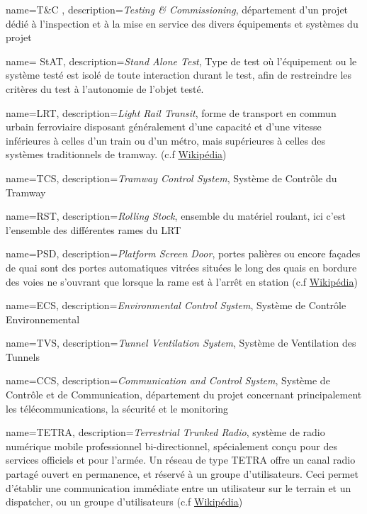 \usepackage[toc,section=chapter]{glossaries}    %
\makeglossaries

{
	name=T\&C ,
	description={\textit{Testing \& Commissioning}, département d'un projet dédié à l'inspection et à la mise en service des divers équipements et systèmes du projet}
}

{
	name= StAT,
	description={\textit{Stand Alone Test}, Type de test où l'équipement ou le système testé est isolé de toute interaction durant le test, afin de restreindre les critères du test à l'autonomie de l'objet testé. }
}

{
	name=LRT,
	description={\textit{Light Rail Transit}, forme de transport en commun urbain ferroviaire disposant généralement d'une capacité et d'une vitesse inférieures à celles d'un train ou d'un métro, mais supérieures à celles des systèmes traditionnels de tramway. (c.f \href{https://fr.wikipedia.org/wiki/Métro_léger}{Wikipédia})}
	}

{
	name=TCS,
	description={\textit{Tramway Control System}, Système de Contrôle du Tramway}
}

{
	name=RST,
	description={\textit{Rolling Stock}, ensemble du matériel roulant, ici c'est l'ensemble des différentes rames du LRT}
}

{
	name=PSD,
	description={\textit{Platform Screen Door}, portes palières ou encore façades de quai sont des portes automatiques vitrées situées le long des quais en bordure des voies ne s'ouvrant que lorsque la rame est à l'arrêt en station (c.f \href{https://fr.wikipedia.org/wiki/Porte_palière_(métro)}{Wikipédia})}
}

{
	name=ECS,
	description={\textit{Environmental Control System}, Système de Contrôle Environnemental}
}

{
	name=TVS,
	description={\textit{Tunnel Ventilation System},  Système de Ventilation des Tunnels }
}

{
	name=CCS,
	description={\textit{Communication and Control System}, Système de Contrôle et de Communication, département du projet concernant principalement les télécommunications, la sécurité et le monitoring}
}

{
	name=TETRA,
	description={\textit{Terrestrial Trunked Radio}, système de radio numérique mobile professionnel bi-directionnel, spécialement conçu pour des services officiels et pour l'armée. Un réseau de type TETRA offre un canal radio partagé ouvert en permanence, et réservé à un groupe d'utilisateurs. Ceci permet d'établir une communication immédiate entre un utilisateur sur le terrain et un dispatcher, ou un groupe d'utilisateurs (c.f \href{https://fr.wikipedia.org/wiki/Terrestrial_Trunked_Radio}{Wikipédia})}
}

